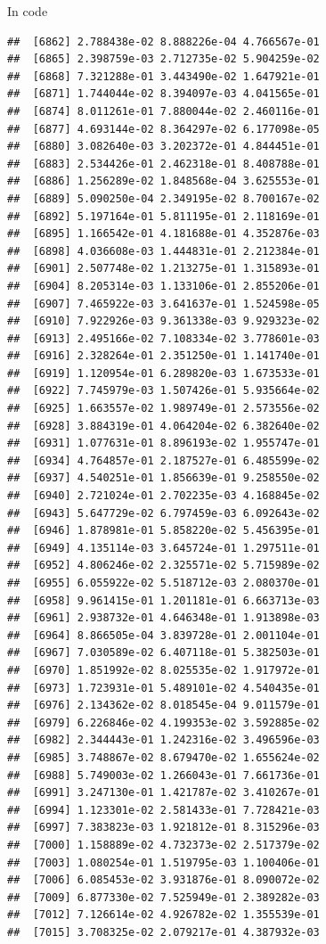 \documentclass[ignorenonframetext,]{beamer}
\begin{document}
\begin{frame}[fragile]{In code}
\begin{verbatim}
##  [6862] 2.788438e-02 8.888226e-04 4.766567e-01
##  [6865] 2.398759e-03 2.712735e-02 5.904259e-02
##  [6868] 7.321288e-01 3.443490e-02 1.647921e-01
##  [6871] 1.744044e-02 8.394097e-03 4.041565e-01
##  [6874] 8.011261e-01 7.880044e-02 2.460116e-01
##  [6877] 4.693144e-02 8.364297e-02 6.177098e-05
##  [6880] 3.082640e-03 3.202372e-01 4.844451e-01
##  [6883] 2.534426e-01 2.462318e-01 8.408788e-01
##  [6886] 1.256289e-02 1.848568e-04 3.625553e-01
##  [6889] 5.090250e-04 2.349195e-02 8.700167e-02
##  [6892] 5.197164e-01 5.811195e-01 2.118169e-01
##  [6895] 1.166542e-01 4.181688e-01 4.352876e-03
##  [6898] 4.036608e-03 1.444831e-01 2.212384e-01
##  [6901] 2.507748e-02 1.213275e-01 1.315893e-01
##  [6904] 8.205314e-03 1.133106e-01 2.855206e-01
##  [6907] 7.465922e-03 3.641637e-01 1.524598e-05
##  [6910] 7.922926e-03 9.361338e-03 9.929323e-02
##  [6913] 2.495166e-02 7.108334e-02 3.778601e-03
##  [6916] 2.328264e-01 2.351250e-01 1.141740e-01
##  [6919] 1.120954e-01 6.289820e-03 1.673533e-01
##  [6922] 7.745979e-03 1.507426e-01 5.935664e-02
##  [6925] 1.663557e-02 1.989749e-01 2.573556e-02
##  [6928] 3.884319e-01 4.064204e-02 6.382640e-02
##  [6931] 1.077631e-01 8.896193e-02 1.955747e-01
##  [6934] 4.764857e-01 2.187527e-01 6.485599e-02
##  [6937] 4.540251e-01 1.856639e-01 9.258550e-02
##  [6940] 2.721024e-01 2.702235e-03 4.168845e-02
##  [6943] 5.647729e-02 6.797459e-03 6.092643e-02
##  [6946] 1.878981e-01 5.858220e-02 5.456395e-01
##  [6949] 4.135114e-03 3.645724e-01 1.297511e-01
##  [6952] 4.806246e-02 2.325571e-02 5.715989e-02
##  [6955] 6.055922e-02 5.518712e-03 2.080370e-01
##  [6958] 9.961415e-01 1.201181e-01 6.663713e-03
##  [6961] 2.938732e-01 4.646348e-01 1.913898e-03
##  [6964] 8.866505e-04 3.839728e-01 2.001104e-01
##  [6967] 7.030589e-02 6.407118e-01 5.382503e-01
##  [6970] 1.851992e-02 8.025535e-02 1.917972e-01
##  [6973] 1.723931e-01 5.489101e-02 4.540435e-01
##  [6976] 2.134362e-02 8.018545e-04 9.011579e-01
##  [6979] 6.226846e-02 4.199353e-02 3.592885e-02
##  [6982] 2.344443e-01 1.242316e-02 3.496596e-03
##  [6985] 3.748867e-02 8.679470e-02 1.655624e-02
##  [6988] 5.749003e-02 1.266043e-01 7.661736e-01
##  [6991] 3.247130e-01 1.421787e-02 3.410267e-01
##  [6994] 1.123301e-02 2.581433e-01 7.728421e-03
##  [6997] 7.383823e-03 1.921812e-01 8.315296e-03
##  [7000] 1.158889e-02 4.732373e-02 2.517379e-02
##  [7003] 1.080254e-01 1.519795e-03 1.100406e-01
##  [7006] 6.085453e-02 3.931876e-01 8.090072e-02
##  [7009] 6.877330e-02 7.525949e-01 2.389282e-03
##  [7012] 7.126614e-02 4.926782e-02 1.355539e-01
##  [7015] 3.708325e-02 2.079217e-01 4.387932e-03

\end{verbatim}
\end{frame}
\end{document}
